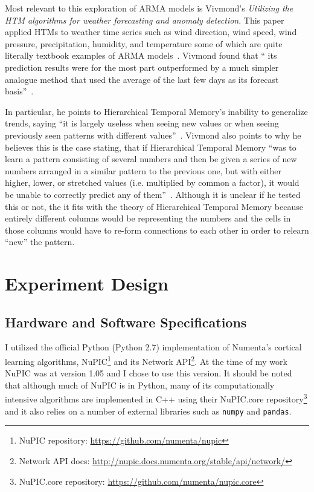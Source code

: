 \documentclass[oneside,12pt,openany]{book}
\begin{document}
	Most relevant to this exploration of ARMA models is Vivmond's \textit{Utilizing the HTM algorithms for weather forecasting and anomaly detection}. This paper applied HTMs to weather time series such as wind direction, wind speed, wind pressure, precipitation, humidity, and temperature some of which are quite literally textbook examples of ARMA models~\cite{Box,WeatherForecast}. Vivmond found that `` its prediction results were for the most part outperformed by a much simpler analogue method that used the average of the last few days as its forecast basis''~\cite{WeatherForecast}. 
	
	In particular, he points to Hierarchical Temporal Memory's inability to generalize trends, saying ``it is largely useless when seeing new values or when seeing previously seen patterns with different values''~\cite{WeatherForecast}. Vivmond also points to why he believes this is the case stating, that if Hierarchical Temporal Memory ``was to learn a pattern consisting of several numbers and then be given a series of new numbers arranged in a similar pattern to the previous one, but with either higher, lower, or stretched values (i.e. multiplied by common a factor), it would be unable to correctly predict any of them''~\cite{WeatherForecast}. Although it is unclear if he tested this or not, the it fits with the theory of Hierarchical Temporal Memory because entirely different columns would be representing the numbers and the cells in those columns would have to re-form connections to each other in order to relearn ``new'' the pattern.
	
	
	
    
    
    
    
    
	
	
	\chapter{Experiment Design}
	
	\section{Hardware and Software Specifications}
	
	I utilized the official Python (Python 2.7) implementation of Numenta's cortical learning algorithms, NuPIC\footnote{NuPIC repository: \href{https://github.com/numenta/nupic}{\ttfamily https://github.com/numenta/nupic} } and its Network API\footnote{Network API docs: \href{http://nupic.docs.numenta.org/stable/api/network/}{\ttfamily http://nupic.docs.numenta.org/stable/api/network/}}. At the time of my work NuPIC was at version 1.05 and I chose to use this version. It should be noted that although much of NuPIC is in Python, many of its computationally intensive algorithms are implemented in C++ using their NuPIC.core repository\footnote{NuPIC.core repository: \href{https://github.com/numenta/nupic.core}{\ttfamily https://github.com/numenta/nupic.core}} and it also relies on a number of external libraries such as \texttt{numpy} and \texttt{pandas}. 
	
\end{document}
